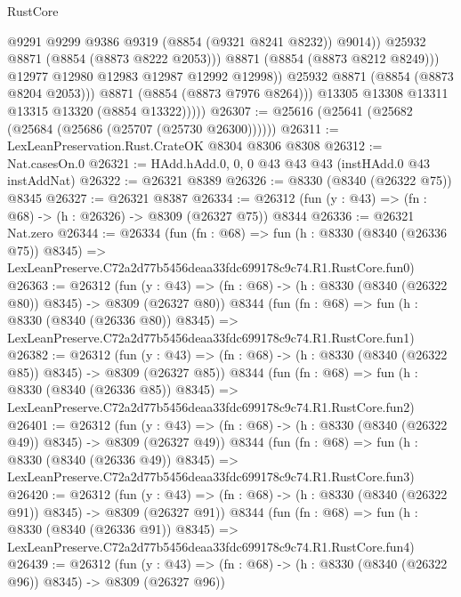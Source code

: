 \begin{lexlean}{RustCore}
\begin{coremodule}
                            @9291
                            @9299
                            @9386
                            @9319
                            (@8854 (@9321 @8241 @8232))
                            @9014))
                        @25932
                        @8871
                        (@8854 (@8873 @8222 @2053)))
                      @8871
                      (@8854 (@8873 @8212 @8249)))
                    @12977
                    @12980
                    @12983
                    @12987
                    @12992
                    @12998))
                @25932
                @8871
                (@8854 (@8873 @8204 @2053)))
              @8871
              (@8854 (@8873 @7976 @8264)))
            @13305
            @13308
            @13311
            @13315
            @13320
            (@8854 @13322)))))
@26307 := @25616 (@25641 (@25682 (@25684 (@25686 (@25707 (@25730 @26300))))))
@26311 := LexLeanPreservation.Rust.CrateOK @8304 @8306 @8308
@26312 := Nat.casesOn.{0}
@26321 := HAdd.hAdd.{0, 0, 0} @43 @43 @43 (instHAdd.{0} @43 instAddNat)
@26322 := @26321 @8389
@26326 := @8330 (@8340 (@26322 @75)) @8345
@26327 := @26321 @8387
@26334 := @26312 (fun (y : @43) => (fn : @68) -> (h : @26326) -> @8309 (@26327 @75)) @8344
@26336 := @26321 Nat.zero
@26344 := @26334
    (fun (fn : @68) =>
    fun (h : @8330 (@8340 (@26336 @75)) @8345) =>
    LexLeanPreserve.C72a2d77b5456deaa33fdc699178c9c74.R1.RustCore.fun0)
@26363 := @26312
    (fun (y : @43) => (fn : @68) -> (h : @8330 (@8340 (@26322 @80)) @8345) -> @8309 (@26327 @80))
    @8344
    (fun (fn : @68) =>
    fun (h : @8330 (@8340 (@26336 @80)) @8345) =>
    LexLeanPreserve.C72a2d77b5456deaa33fdc699178c9c74.R1.RustCore.fun1)
@26382 := @26312
    (fun (y : @43) => (fn : @68) -> (h : @8330 (@8340 (@26322 @85)) @8345) -> @8309 (@26327 @85))
    @8344
    (fun (fn : @68) =>
    fun (h : @8330 (@8340 (@26336 @85)) @8345) =>
    LexLeanPreserve.C72a2d77b5456deaa33fdc699178c9c74.R1.RustCore.fun2)
@26401 := @26312
    (fun (y : @43) => (fn : @68) -> (h : @8330 (@8340 (@26322 @49)) @8345) -> @8309 (@26327 @49))
    @8344
    (fun (fn : @68) =>
    fun (h : @8330 (@8340 (@26336 @49)) @8345) =>
    LexLeanPreserve.C72a2d77b5456deaa33fdc699178c9c74.R1.RustCore.fun3)
@26420 := @26312
    (fun (y : @43) => (fn : @68) -> (h : @8330 (@8340 (@26322 @91)) @8345) -> @8309 (@26327 @91))
    @8344
    (fun (fn : @68) =>
    fun (h : @8330 (@8340 (@26336 @91)) @8345) =>
    LexLeanPreserve.C72a2d77b5456deaa33fdc699178c9c74.R1.RustCore.fun4)
@26439 := @26312
    (fun (y : @43) => (fn : @68) -> (h : @8330 (@8340 (@26322 @96)) @8345) -> @8309 (@26327 @96))

\end{coremodule}
\end{lexlean}
